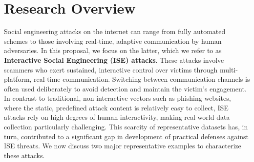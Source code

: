 \section{Research Overview}
\label{sec:overview}


Social engineering attacks on the internet can range from fully automated schemes to those involving real-time, adaptive communication by human adversaries. In this proposal, we focus on the latter, which we refer to as \textbf{Interactive Social Engineering (ISE) attacks}. These attacks involve scammers who exert sustained, interactive control over victims through multi-platform, real-time communication. Switching between communication channels is often used deliberately to avoid detection and maintain the victim's engagement. In contrast to traditional, non-interactive vectors such as phishing websites, where the static, predefined attack content is relatively easy to collect, ISE attacks rely on high degrees of human interactivity, making real-world data collection particularly challenging. This scarcity of representative datasets has, in turn, contributed to a significant gap in development of practical defenses against ISE threats. We now discuss two major representative examples to characterize these attacks.

